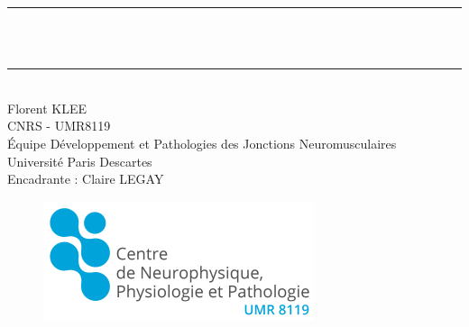 \begin{center}
\rule{\textwidth}{0.5pt} \\[0.4cm]
{\huge \bfseries \titredoc\\[0.4cm]} %
\rule{\textwidth}{0.5pt} \\[1.5cm]

Florent KLEE \\
CNRS - UMR8119\\
Équipe Développement et Pathologies des Jonctions Neuromusculaires\\
Université Paris Descartes\\
Encadrante : Claire LEGAY\\
\vspace{1cm}

\begin{figure}[!b] %
	\centering
	\includegraphics[height=0.1\textheight]{./Images/Logo_UMR8119.png}
\end{figure}

\end{center}